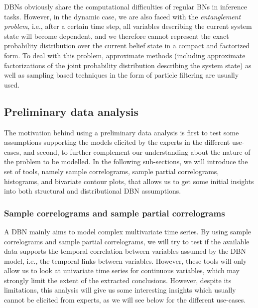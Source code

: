 DBNs obviously share the computational difficulties of regular BNs in inference tasks. However, in the dynamic case, we are also faced with the \textit{entanglement problem}, i.e., after a certain time step, all variables describing the current system state will become dependent, and we therefore cannot represent the exact probability distribution over the current belief state in a compact and factorized form. To deal with this problem, approximate methods (including approximate factorizations of the joint probability distribution describing the system state) \cite{BoyenKoller1998} as well as sampling based techniques in the form of particle filtering \cite{Doucet2000} are usually used.

\subsection{Preliminary data analysis}\label{SubSection:DataAnalysis}

The motivation behind using a preliminary data analysis is first to test some assumptions supporting the models elicited by the experts in the different use-cases, and second, to further complement our understanding about the nature of the problem to be modelled. In the following sub-sections, we will introduce the set of tools, namely sample correlograms, sample partial correlograms, histograms, and bivariate contour plots, that allows us to get some initial insights into both structural and distributional DBN assumptions.

\subsubsection{Sample correlograms and sample partial correlograms}

A DBN mainly aims to model complex multivariate time series. By using sample correlograms and sample partial correlograms, we will try to test if the available data supports the temporal correlation between variables assumed by the DBN model, i.e., the temporal links between variables. However, these tools will only allow us to look at univariate time series for continuous variables, which may strongly limit the extent of the extracted conclusions. However, despite its limitations, this analysis will give us some interesting insights which usually cannot be elicited from experts, as we will see below for the different use-cases.  

